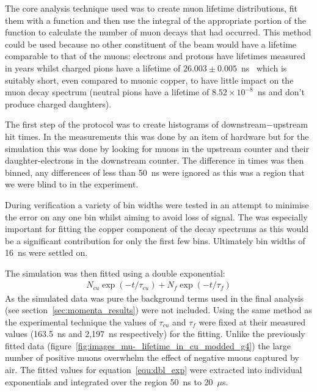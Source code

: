 
The core analysis technique used was to create muon lifetime distributions, fit them with a function and then use the integral of the appropriate portion of the function to calculate the number of muon decays that had occurred. This method could be used because no other constituent of the beam would have a lifetime comparable to that of the muons: electrons and protons have lifetimes measured in years whilst charged pions have a lifetime of \(26.003\pm0.005\)~ns~\cite{pdg} which is suitably short, even compared to muonic copper, to have little impact on the muon decay spectrum (neutral pions have a lifetime of \( 8.52\times10^{-8}\)~ns and don't produce charged daughters).

The first step of the protocol was to create histograms of downstream\(-\)upstream hit times. In the measurements this was done by an item of hardware but for the simulation this was done by looking for muons in the upstream counter and their daughter-electrons in the downstream counter. The difference in times was then binned, any differences of less than 50~ns were ignored as this was a region that we were blind to in the experiment.

During verification a variety of bin widths were tested in an attempt to minimise the error on any one bin whilst aiming to avoid loss of signal. The was especially important for fitting the copper component of the decay spectrums as this would be a significant contribution for only the first few bins. Ultimately bin widths of 16~ns were settled on.

The simulation was then fitted using a double exponential: 
\begin{align}
    N_{cu}\exp(-t/\tau_{cu}) + N_{f}\exp(-t/\tau_{f}) \label{equ:dbl_exp}
\end{align}
As the simulated data was pure the background terms used in the final analysis (see section~\ref{sec:momenta_results}) were not included. Using the same method as the experimental technique the values of \(\tau_{cu}\) and \(\tau_{f}\) were fixed at their measured values (163.5~ns and 2,197~ns respectively) for the fitting. Unlike the previously fitted data (figure~\ref{fig:images_mu-_lifetime_in_cu_modded_g4}) the large number of positive muons overwhelm the effect of negative muons captured by air. The fitted values for equation~\eqref{equ:dbl_exp} were extracted into individual exponentials and integrated over the region 50~ns to 20~\(\mu\)s. 

